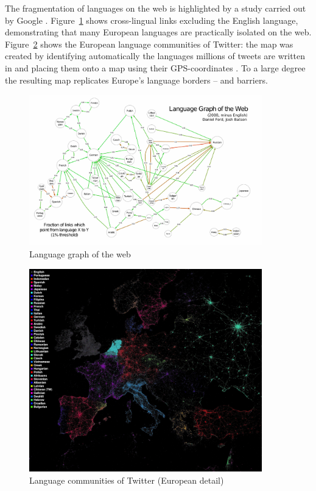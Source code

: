 \documentclass[10pt, plain]{../../metanetpaper}
\begin{document}
\begin{multicols}{2}
The fragmentation of languages on the web is highlighted by a study carried out by Google \cite{Ford11}. Figure~\ref{fig:language-graph-of-the-web} shows cross-lingual links excluding the English language, demonstrating that many European languages are practically isolated on the web.  Figure~\ref{fig:european-languages-in-twitter} shows the European language communities of Twitter: the map was created by identifying automatically the languages millions of tweets are written in and placing them onto a map using their GPS-coordinates \cite{fisher11}. To a large degree the resulting map replicates Europe's language borders -- and barriers.

\begin{figure}[htb]
  \center
  \includegraphics[width=0.9\textwidth]{../_media/Language-Graph}
  \caption{Language graph of the web}
  \label{fig:language-graph-of-the-web}
\end{figure}

\begin{figure}[htb]
  \center
  \includegraphics[width=0.9\textwidth]{../_media/twitter-languages-europe}
  \caption{Language communities of Twitter (European detail)}
  \label{fig:european-languages-in-twitter}
\end{figure}


\end{multicols}
\end{document}
